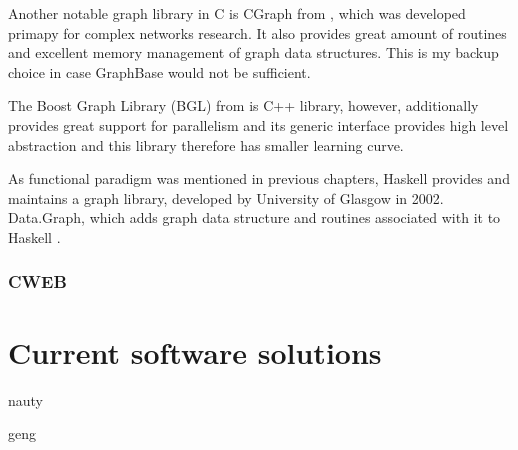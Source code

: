 Another notable graph library in C is CGraph from \textcite{cesar-2013}, which was developed primapy for complex networks research. It also provides great amount of routines and excellent memory management of graph data structures. This is my backup choice in case GraphBase would not be sufficient. 

The Boost Graph Library (BGL) from \textcite{siek2002boost} is C++ library, however, additionally provides great support for parallelism and its generic interface provides high level abstraction and this library therefore has smaller learning  curve. 

As functional paradigm was mentioned in previous chapters, Haskell provides and maintains a graph library, developed by University of Glasgow in 2002. Data.Graph, which adds graph data structure and routines associated with it to Haskell \parencite{UniOfGlasgow2002}.

\subsubsection{CWEB}

\section{Current software solutions}

nauty

geng


